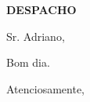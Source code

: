 \documentclass[mat]{matletter}
\date{5 de maio de 2018}
\begin{document}
\begin{letter}{\textbf{DESPACHO}}

\opening{Sr. Adriano,}

Bom dia.


\closing{Atenciosamente,}
\end{letter}
\end{document}
